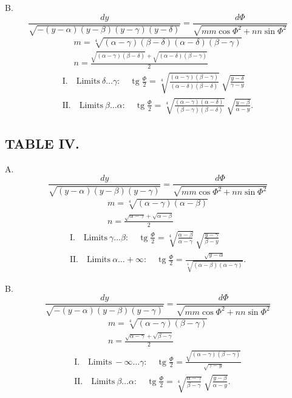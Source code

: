 \documentclass{article}
\begin{document}
B.
\[
\frac{dy}{\sqrt{-(y-\alpha)(y-\beta)(y-\gamma)(y-\delta)}}=\frac{d\Phi}{\sqrt{mm\cos\Phi^{2}+nn\sin\Phi^{2}}}
\]
\[
\begin{gathered}
m=\sqrt[4]{(\alpha-\gamma)(\beta-\delta)(\alpha-\delta)(\beta-\gamma)}\\
n=\frac{\sqrt{(\alpha-\gamma)(\beta-\delta)}+\sqrt{(\alpha-\delta)(\beta-\gamma)}}{2}
\end{gathered}
\]
\[
\begin{gathered}
\text{I.}\quad\text{Limits}\ \delta\ldots\gamma:\quad\operatorname{tg}\frac{\Phi}{2}=\sqrt[4]{\frac{(\alpha-\gamma)(\beta-\gamma)}{(\alpha-\delta)(\beta-\delta)}}\ \sqrt{\frac{y-\delta}{\gamma-y}}\\
\text{II.}\quad\text{Limits}\ \beta\ldots\alpha:\quad\operatorname{tg}\frac{\Phi}{2}=\sqrt[4]{\frac{(\alpha-\gamma)(\alpha-\delta)}{(\beta-\gamma)(\beta-\delta)}}\ \sqrt{\frac{y-\beta}{\alpha-y}}.
\end{gathered}
\]


\subsection*{TABLE IV.}

A.
\[
\frac{dy}{\sqrt{(y-\alpha)(y-\beta)(y-\gamma)}}=\frac{d\Phi}{\sqrt{mm\cos\Phi^{2}+nn\sin\Phi^{2}}}
\]
\[
\begin{gathered}
m=\sqrt[4]{(\alpha-\gamma)(\alpha-\beta)}\\
n=\frac{\sqrt{\alpha-\gamma}+\sqrt{\alpha-\beta}}{2}
\end{gathered}
\]
\[
\begin{gathered}
\text{I.}\quad\text{Limits}\ \gamma\ldots\beta:\quad\operatorname{tg}\frac{\Phi}{2}=\sqrt[4]{\frac{\alpha-\beta}{\alpha-\gamma}}\ \sqrt{\frac{y-\gamma}{\beta-y}}\\
\text{II.}\quad\text{Limits}\ \alpha\ldots+\infty:\quad\operatorname{tg}\frac{\Phi}{2}=\frac{\sqrt{y-\alpha}}{\sqrt[4]{(\alpha-\beta)(\alpha-\gamma)}}.
\end{gathered}
\]

B.
\[
\frac{dy}{\sqrt{-(y-\alpha)(y-\beta)(y-\gamma)}}=\frac{d\Phi}{\sqrt{mm\cos\Phi^{2}+nn\sin\Phi^{2}}}
\]
\[
\begin{gathered}
m=\sqrt[4]{(\alpha-\gamma)(\beta-\gamma)}\\
n=\frac{\sqrt{\alpha-\gamma}+\sqrt{\beta-\gamma}}{2}
\end{gathered}
\]
\[
\begin{gathered}
\text{I.}\quad\text{Limits}\ -\infty\ldots\gamma:\quad\operatorname{tg}\frac{\Phi}{2}=\frac{\sqrt{(\alpha-\gamma)(\beta-\gamma)}}{\sqrt{\gamma-y}}\\
\text{II.}\quad\text{Limits}\ \beta\ldots\alpha:\quad\operatorname{tg}\frac{\Phi}{2}=\sqrt[4]{\frac{\alpha-\gamma}{\beta-\gamma}}\ \sqrt{\frac{y-\beta}{\alpha-y}}.
\end{gathered}
\]
\end{document}
